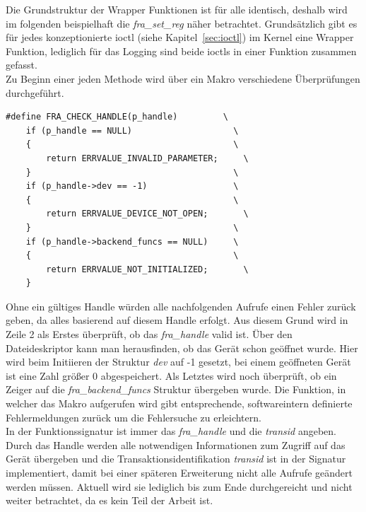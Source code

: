 Die Grundstruktur der Wrapper Funktionen ist für alle identisch, deshalb wird im folgenden beispielhaft die \textit{fra\_set\_reg} näher betrachtet. Grundsätzlich gibt es für jedes konzeptionierte \ac{ioctl} (siehe Kapitel~\ref{sec:ioctl}) im Kernel eine Wrapper Funktion, lediglich für das Logging sind beide \ac{ioctl}s in einer Funktion zusammen gefasst.\\ 


Zu Beginn einer jeden Methode wird über ein Makro verschiedene Überprüfungen durchgeführt. 

\begin{lstfloat}
\begin{lstlisting}
#define FRA_CHECK_HANDLE(p_handle)         \
	if (p_handle == NULL)                    \
	{                                        \
		return ERRVALUE_INVALID_PARAMETER;     \
	}                                        \
	if (p_handle->dev == -1)                 \
	{                                        \
		return ERRVALUE_DEVICE_NOT_OPEN;       \
	}                                        \
	if (p_handle->backend_funcs == NULL)     \
	{                                        \
		return ERRVALUE_NOT_INITIALIZED;       \
	}  
\end{lstlisting}
\end{lstfloat}

Ohne ein gültiges Handle würden alle nachfolgenden Aufrufe einen Fehler zurück geben, da alles basierend auf diesem Handle erfolgt. Aus diesem Grund wird in Zeile 2 als Erstes überprüft, ob das \textit{fra\_handle} valid ist. Über den Dateideskriptor kann man herausfinden, ob das Gerät schon geöffnet wurde. Hier wird beim Initiieren der Struktur \textit{dev} auf -1 gesetzt, bei einem geöffneten Gerät ist eine Zahl größer 0 abgespeichert. Als Letztes wird noch überprüft, ob ein Zeiger auf die \textit{fra\_backend\_funcs} Struktur übergeben wurde. Die Funktion, in welcher das Makro aufgerufen wird gibt entsprechende, softwareintern definierte Fehlermeldungen zurück um die Fehlersuche zu erleichtern.\\

In der Funktionssignatur ist immer das \textit{fra\_handle} und die \textit{transid} angeben. Durch das Handle werden alle notwendigen Informationen zum Zugriff auf das Gerät übergeben und die Transaktionsidentifikation \textit{transid} ist in der Signatur implementiert, damit bei einer späteren Erweiterung nicht alle Aufrufe geändert werden müssen. Aktuell wird sie lediglich bis zum Ende durchgereicht und nicht weiter betrachtet, da es kein Teil der Arbeit ist.

